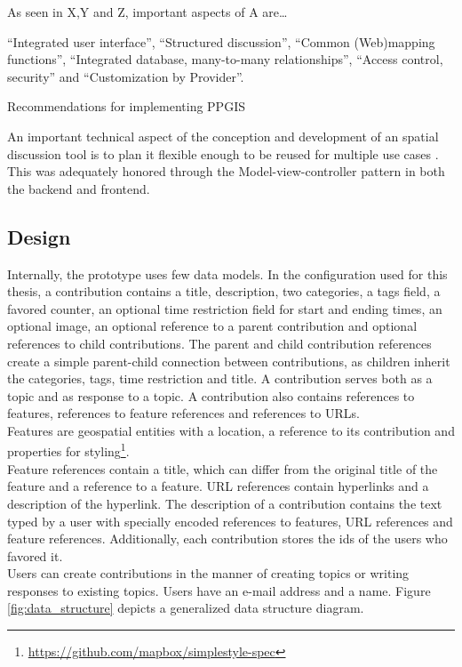 As seen in X,Y and Z, important aspects of A are\dots

``Integrated user interface'', ``Structured discussion'', ``Common (Web)mapping functions'', ``Integrated database, many-to-many relationships'', ``Access control, security'' and ``Customization by Provider''. \cite{Kessler2005_ArgumentationMapPrototype}

Recommendations for implementing PPGIS \cite{Carver2001_PPGIS_Cyberdemocracy} \cite{Voss2004_Evolution_PGIS}


An important technical aspect of the conception and development of an spatial discussion tool is to plan it flexible enough to be reused for multiple use cases \cite{Kessler 2005_Conflict_Resolution,Kessler 2005_ArgumentationMap_Prototype,Sani2011_Scalable_Argumap}. This was adequately honored through the Model-view-controller pattern in both the backend and frontend. %

\subsection{Design} %
\label{sub:design}

Internally, the prototype uses few data models. In the configuration used for this thesis, a contribution contains a title, description, two categories, a tags field, a favored counter, an optional time restriction field for start and ending times, an optional image, an optional reference to a parent contribution and optional references to child contributions. The parent and child contribution references create a simple parent-child connection between contributions, as children inherit the categories, tags, time restriction and title. A contribution serves both as a topic and as response to a topic. A contribution also contains references to features, references to feature references and references to URLs.\\
Features are geospatial entities with a location, a reference to its contribution and properties for styling\footnote{\url{https://github.com/mapbox/simplestyle-spec}}.\\
Feature references contain a title, which can differ from the original title of the feature and a reference to a feature. URL references contain hyperlinks and a description of the hyperlink. The description of a contribution contains the text typed by a user with specially encoded references to features, URL references and feature references. Additionally, each contribution stores the ids of the users who favored it.\\
Users can create contributions in the manner of creating topics or writing responses to existing topics. Users have an e-mail address and a name. Figure \ref{fig:data_structure} depicts a generalized data structure diagram.

